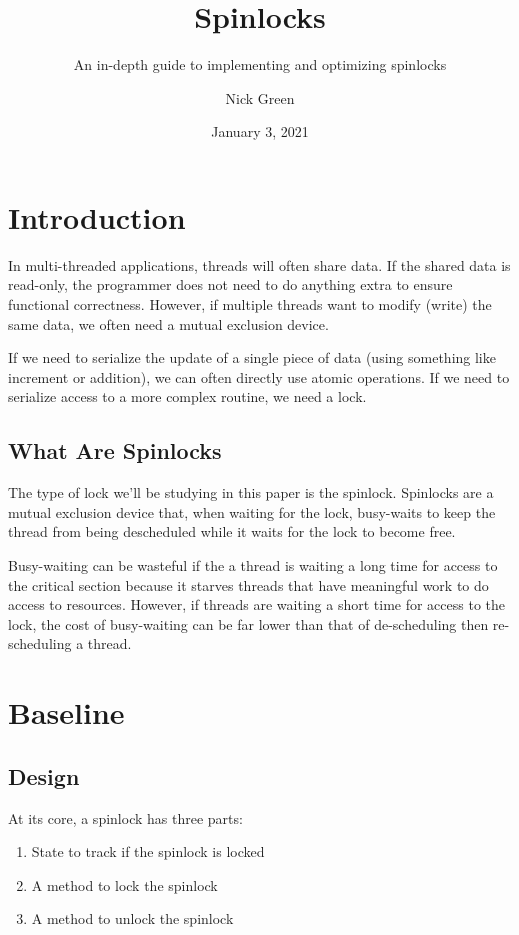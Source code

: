 \documentclass[11pt,fancy,authoryear]{elegantbook}
\title{Spinlocks}
\subtitle{An in-depth guide to implementing and optimizing spinlocks}
\author{Nick Green}
\institute{CoffeeBeforeArch}
\date{January 3, 2021}
\begin{document}
\maketitle

\frontmatter
\tableofcontents

\mainmatter

\chapter{Introduction}

In multi-threaded applications, threads will often share data. If the shared data is read-only, the programmer does not need to do anything extra to ensure functional correctness. However, if multiple threads want to modify (write) the same data, we often need a mutual exclusion device.

If we need to serialize the update of a single piece of data (using something like increment or addition), we can often directly use atomic operations. If we need to serialize access to a more complex routine, we need a lock.

\section{What Are Spinlocks}

The type of lock we'll be studying in this paper is the spinlock. Spinlocks are a mutual exclusion device that, when waiting for the lock, busy-waits to keep the thread from being descheduled while it waits for the lock to become free.

Busy-waiting can be wasteful if the a thread is waiting a long time for access to the critical section because it starves threads that have meaningful work to do access to resources. However, if threads are waiting a short time for access to the lock, the cost of busy-waiting can be far lower than that of de-scheduling then re-scheduling a thread.

\chapter{Baseline}

\section{Design}

At its core, a spinlock has three parts:

\begin{enumerate}
  \item State to track if the spinlock is locked
  \item A method to lock the spinlock
  \item A method to unlock the spinlock
\end{enumerate}
\end{document}
